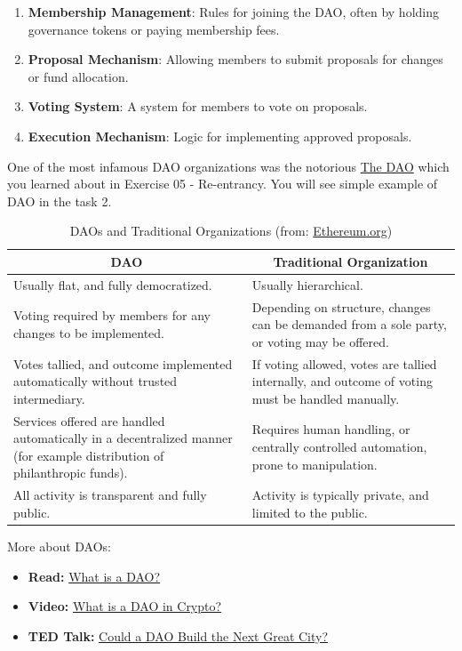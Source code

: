 \documentclass[12pt]{article}
\begin{document}
\begin{enumerate}
    \item \textbf{Membership Management}: Rules for joining the DAO, often by holding governance tokens or paying membership fees.
    \item \textbf{Proposal Mechanism}: Allowing members to submit proposals for changes or fund allocation.
    \item \textbf{Voting System}: A system for members to vote on proposals.
    \item \textbf{Execution Mechanism}: Logic for implementing approved proposals.
\end{enumerate}

\noindent
One of the most infamous DAO organizations was the notorious \href{https://en.wikipedia.org/wiki/The_DAO}{The DAO} which you learned about in Exercise 05 - Re-entrancy. You will see simple example of DAO in the task 2.

\begin{table}[H]
\centering
\footnotesize
\begin{tabular}{|p{}|p{}|}
\hline
\multicolumn{1}{|c|}{\textbf{DAO}} & \multicolumn{1}{c|}{\textbf{Traditional Organization}} \\
\hline
Usually flat, and fully democratized. & Usually hierarchical. \\
\hline
Voting required by members for any changes to be implemented. & Depending on structure, changes can be demanded from a sole party, or voting may be offered. \\
\hline
Votes tallied, and outcome implemented automatically without trusted intermediary. & If voting allowed, votes are tallied internally, and outcome of voting must be handled manually. \\
\hline
Services offered are handled automatically in a decentralized manner (for example distribution of philanthropic funds). & Requires human handling, or centrally controlled automation, prone to manipulation. \\
\hline
All activity is transparent and fully public. & Activity is typically private, and limited to the public. \\
\hline
\end{tabular}
\caption{DAOs and Traditional Organizations (from: \href{https://ethereum.org/dao/}{Ethereum.org})}
\label{tab:dao-comparison}
\end{table}

\medskip
\noindent
More about DAOs:
\begin{itemize}
  \item \textbf{Read:} \href{https://ethereum.org/dao/#what-are-daos}{What is a DAO?}
  \item \textbf{Video:} \href{https://www.youtube.com/watch?v=KHm0uUPqmVE}{What is a DAO in Crypto?}
  \item \textbf{TED Talk:} \href{https://www.youtube.com/watch?v=zTStDvUtQWc}{Could a DAO Build the Next Great City?}
\end{itemize}
\end{document}
